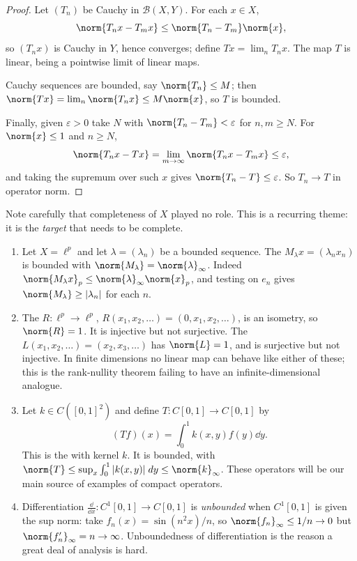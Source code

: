 \documentclass[a4paper]{scrartcl}
\newcommand{\Bop}{\mathcal{B}}
\begin{document}
\begin{proof}
	Let $(T_n)$ be Cauchy in $\Bop(X,Y)$. For each $x \in X$,
	$$\norm{T_n x - T_m x} \leq \norm{T_n - T_m}\norm{x},$$
	so $(T_n x)$ is Cauchy in $Y$, hence converges; define $Tx = \lim_n T_n x$. The map $T$ is linear, being a pointwise limit of linear maps.

	Cauchy sequences are bounded, say $\norm{T_n} \leq M$; then $\norm{Tx} = \lim_n \norm{T_n x} \leq M \norm{x}$, so $T$ is bounded.

	Finally, given $\varepsilon > 0$ take $N$ with $\norm{T_n - T_m} < \varepsilon$ for $n, m \geq N$. For $\norm{x} \leq 1$ and $n \geq N$,
	$$\norm{T_n x - Tx} = \lim_{m \to \infty} \norm{T_n x - T_m x} \leq \varepsilon,$$
	and taking the supremum over such $x$ gives $\norm{T_n - T} \leq \varepsilon$. So $T_n \to T$ in operator norm.
\end{proof}

Note carefully that completeness of $X$ played no role. This is a recurring theme: it is the \emph{target} that needs to be complete.

\begin{example}
	\begin{enumerate}[label=(\roman*)]
		\item Let $X = \ell^p$ and let $\lambda = (\lambda_n)$ be a bounded sequence. The  $M_\lambda x = (\lambda_n x_n)$ is bounded with $\norm{M_\lambda} = \norm{\lambda}_\infty$. Indeed $\norm{M_\lambda x}_p \leq \norm{\lambda}_\infty \norm{x}_p$, and testing on $e_n$ gives $\norm{M_\lambda} \geq |\lambda_n|$ for each $n$.
		\item The  $R : \ell^p \to \ell^p$, $R(x_1, x_2, \dots) = (0, x_1, x_2, \dots)$, is an isometry, so $\norm{R} = 1$. It is injective but not surjective. The  $L(x_1, x_2, \dots) = (x_2, x_3, \dots)$ has $\norm{L} = 1$, and is surjective but not injective. In finite dimensions no linear map can behave like either of these; this is the rank-nullity theorem failing to have an infinite-dimensional analogue.
		\item Let $k \in C([0,1]^2)$ and define $T : C[0,1] \to C[0,1]$ by
		$$(Tf)(x) = \int_0^1 k(x,y) f(y) \dd y.$$
		This is the  with kernel $k$. It is bounded, with $\norm{T} \leq \sup_{x} \int_0^1 |k(x,y)| \dd y \leq \norm{k}_\infty$. These operators will be our main source of examples of compact operators.
		\item Differentiation $\frac{\dd}{\dd x} : C^1[0,1] \to C[0,1]$ is \emph{unbounded} when $C^1[0,1]$ is given the sup norm: take $f_n(x) = \sin(n^2x)/n$, so $\norm{f_n}_\infty \leq 1/n \to 0$ but $\norm{f_n'}_\infty = n \to \infty$. Unboundedness of differentiation is the reason a great deal of analysis is hard.
	\end{enumerate}
\end{example}
\end{document}
